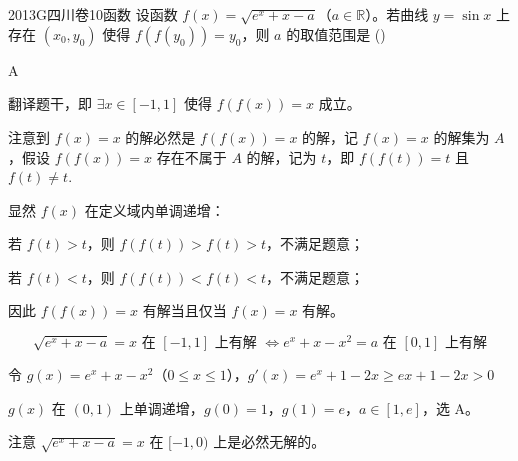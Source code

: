 
\begin{problem}{2013}{G}{四川卷}{10}{函数}
设函数 $ f(x)=\sqrt{e^x+x-a} $（$ a\in\mathbb{R} $）。若曲线 $ y=\sin x $ 上存在 $ (x_0,y_0) $ 使得 $ f(f(y_0))=y_0 $，则 $ a $ 的取值范围是 (\hspace{1cm})
\begin{choices}
\choice{{$[1,e]$}}
\choice{{$[e^{-1}-1,1]$}}
\choice{{$[1,1+e]$}}
\choice{{$[e^{-1}-1,e+1]$}}
\end{choices}
\end{problem}

\begin{answer}
A
\end{answer}

\begin{solutions}
翻译题干，即 $ \exists x\in[-1,1] $ 使得 $ f(f(x))=x $ 成立。

注意到 $ f(x)=x $ 的解必然是 $ f(f(x))=x $ 的解，记 $ f(x)=x $ 的解集为 $ A $，假设 $ f(f(x))=x $ 存在不属于 $ A $ 的解，记为 $ t $，即 $ f(f(t))=t $ 且 $ f(t)\ne t $.

显然 $ f(x) $ 在定义域内单调递增：

若 $ f(t)>t $，则 $ f(f(t))>f(t)>t $，不满足题意；

若 $ f(t)<t $，则 $ f(f(t))<f(t)<t $，不满足题意；

因此 $ f(f(x))=x $ 有解当且仅当 $ f(x)=x $ 有解。

$$
\sqrt{e^x+x-a}=x \text{ 在 } [-1,1] \text{ 上有解 } \Leftrightarrow e^x+x-x^2=a \text{ 在 } [0,1] \text{ 上有解}
$$

令 $ g(x)=e^x+x-x^2 $（$ 0\le x\le1 $），$ g'(x)=e^x+1-2x\ge ex+1-2x>0 $

$ g(x) $ 在 $ (0,1) $ 上单调递增，$ g(0)=1 $，$ g(1)=e $，$ a\in[1,e] $，选 A。

注意 $ \sqrt{e^x+x-a}=x $ 在 $ [-1,0) $ 上是必然无解的。
\end{solutions}